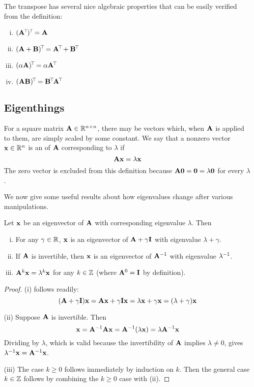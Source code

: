The transpose has several nice algebraic properties that can be easily verified from the definition:
\begin{enumerate}[(i)]
\item $(\mathbf{A}^{\!\top\!})^{\!\top\!} = \mathbf{A}$
\item $(\mathbf{A}+\mathbf{B})^{\!\top\!} = \mathbf{A}^{\!\top\!} + \mathbf{B}^{\!\top\!}$
\item $(\alpha \mathbf{A})^{\!\top\!} = \alpha \mathbf{A}^{\!\top\!}$
\item $(\mathbf{A}\mathbf{B})^{\!\top\!} = \mathbf{B}^{\!\top\!} \mathbf{A}^{\!\top\!}$
\end{enumerate}

\subsection{Eigenthings}
For a square matrix $\mathbf{A} \in \mathbb{R}^{n \times n}$, there may be vectors which, when $\mathbf{A}$ is applied to them, are simply scaled by some constant.
We say that a nonzero vector $\mathbf{x} \in \mathbb{R}^n$ is an  of $\mathbf{A}$ corresponding to  $\lambda$ if
\[\mathbf{A}\mathbf{x} = \lambda\mathbf{x}\]
The zero vector is excluded from this definition because $\mathbf{A}\mathbf{0} = \mathbf{0} = \lambda\mathbf{0}$ for every $\lambda$.

We now give some useful results about how eigenvalues change after various manipulations.
\begin{proposition}
Let $\mathbf{x}$ be an eigenvector of $\mathbf{A}$ with corresponding eigenvalue $\lambda$.
Then
\begin{enumerate}[(i)]
\item For any $\gamma \in \mathbb{R}$, $\mathbf{x}$ is an eigenvector of $\mathbf{A} + \gamma\mathbf{I}$ with eigenvalue $\lambda + \gamma$.
\item If $\mathbf{A}$ is invertible, then $\mathbf{x}$ is an eigenvector of $\mathbf{A}^{-1}$ with eigenvalue $\lambda^{-1}$.
\item $\mathbf{A}^k\mathbf{x} = \lambda^k\mathbf{x}$ for any $k \in \mathbb{Z}$ (where $\mathbf{A}^0 = \mathbf{I}$ by definition).
\end{enumerate}
\end{proposition}
\begin{proof}
(i) follows readily:
\[(\mathbf{A} + \gamma\mathbf{I})\mathbf{x} = \mathbf{A}\mathbf{x} + \gamma\mathbf{I}\mathbf{x} = \lambda\mathbf{x} + \gamma\mathbf{x} = (\lambda + \gamma)\mathbf{x}\]

(ii) Suppose $\mathbf{A}$ is invertible. Then
\[\mathbf{x} = \mathbf{A}^{-1}\mathbf{A}\mathbf{x} = \mathbf{A}^{-1}(\lambda\mathbf{x}) = \lambda\mathbf{A}^{-1}\mathbf{x}\]
Dividing by $\lambda$, which is valid because the invertibility of $\mathbf{A}$ implies $\lambda \neq 0$, gives $\lambda^{-1}\mathbf{x} = \mathbf{A}^{-1}\mathbf{x}$.

(iii) The case $k \geq 0$ follows immediately by induction on $k$.
Then the general case $k \in \mathbb{Z}$ follows by combining the $k \geq 0$ case with (ii).
\end{proof}


